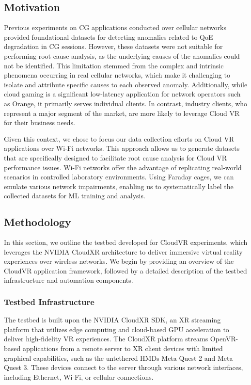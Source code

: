 \subsection{Motivation}
Previous experiments on CG applications conducted over cellular networks provided foundational datasets for detecting anomalies related to QoE degradation in CG sessions. However, these datasets were not suitable for performing root cause analysis, as the underlying causes of the anomalies could not be identified. This limitation stemmed from the complex and intrinsic phenomena occurring in real cellular networks, which make it challenging to isolate and attribute specific causes to each observed anomaly. Additionally, while cloud gaming is a significant low-latency application for network operators such as Orange, it primarily serves individual clients. In contrast, industry clients, who represent a major segment of the market, are more likely to leverage Cloud VR for their business needs.

Given this context, we chose to focus our data collection efforts on Cloud VR applications over Wi-Fi networks. This approach allows us to generate datasets that are specifically designed to facilitate root cause analysis for Cloud VR performance issues. Wi-Fi networks offer the advantage of replicating real-world scenarios in controlled laboratory environments. Using Faraday cages, we can emulate various network impairments, enabling us to systematically label the collected datasets for ML training and analysis.

\subsection{Methodology}

In this section, we outline the testbed developed for CloudVR experiments, which leverages the NVIDIA CloudXR architecture to deliver immersive virtual reality experiences over wireless networks. We begin by providing an overview of the CloudVR application framework, followed by a detailed description of the testbed infrastructure and automation components.


\subsubsection{Testbed Infrastructure}

The testbed is built upon the NVIDIA CloudXR SDK, an \ac{XR} streaming platform that utilizes edge computing and cloud-based GPU acceleration to deliver high-fidelity VR experiences. The CloudXR platform streams OpenVR-based applications from a remote server to XR client devices with limited graphical capabilities, such as the untethered \ac{HMDs} Meta Quest 2 and Meta Quest 3. These devices connect to the server through various network interfaces, including Ethernet, Wi-Fi, or cellular connections.

